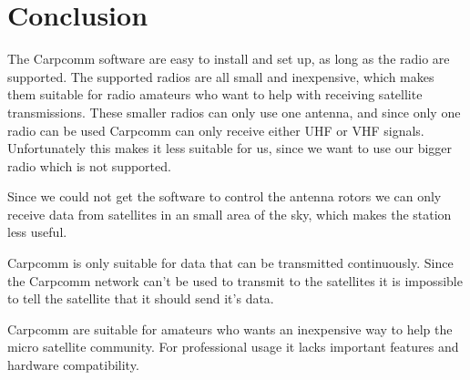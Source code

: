 \section{Conclusion}
The Carpcomm software are easy to install and set up, as long as the radio are supported. The supported radios are all small and inexpensive, which makes them suitable for radio amateurs who want to help with receiving satellite transmissions. These smaller radios can only use one antenna, and since only one radio can be used Carpcomm can only receive either UHF or VHF signals. Unfortunately this makes it less suitable for us, since we want to use our bigger radio which is not supported.

Since we could not get the software to control the antenna rotors we can only receive data from satellites in an small area of the sky, which makes the station less useful.

Carpcomm is only suitable for data that can be transmitted continuously. Since the Carpcomm network can't be used to transmit to the satellites it is impossible to tell the satellite that it should send it's data.

Carpcomm are suitable for amateurs who wants an inexpensive way to help the micro satellite community. For professional usage it lacks important features and hardware compatibility.